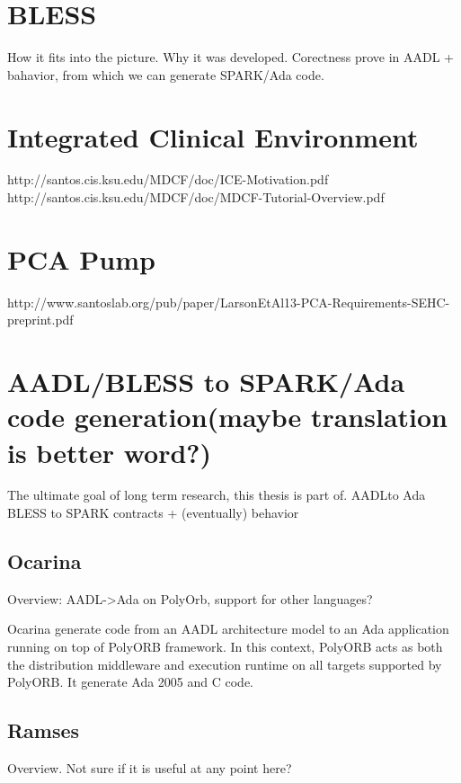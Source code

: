 \section{BLESS}
\label{background:bless}
How it fits into the picture. Why it was developed. Corectness prove in AADL + bahavior, from which we can generate SPARK/Ada code.


\section{Integrated Clinical Environment}
\label{background:ice}
http://santos.cis.ksu.edu/MDCF/doc/ICE-Motivation.pdf
http://santos.cis.ksu.edu/MDCF/doc/MDCF-Tutorial-Overview.pdf


\section{PCA Pump}
\label{background:pcapump}
http://www.santoslab.org/pub/paper/LarsonEtAl13-PCA-Requirements-SEHC-preprint.pdf


\section{AADL/BLESS to SPARK/Ada code generation(maybe translation is better word?)}
\label{background:codegen}
The ultimate goal of long term research, this thesis is part of.
AADLto Ada
BLESS to SPARK contracts + (eventually) behavior

\subsection{Ocarina}
\label{background:codegen:ocarina}
Overview: AADL->Ada on PolyOrb, support for other languages?

Ocarina generate code from an AADL architecture model to an Ada application running on top of PolyORB framework. In this context, PolyORB acts as both the distribution middleware and execution runtime on all targets supported by PolyORB.
It generate Ada 2005 and C code.


\subsection{Ramses}
\label{background:codegen:ramses}
Overview. Not sure if it is useful at any point here?